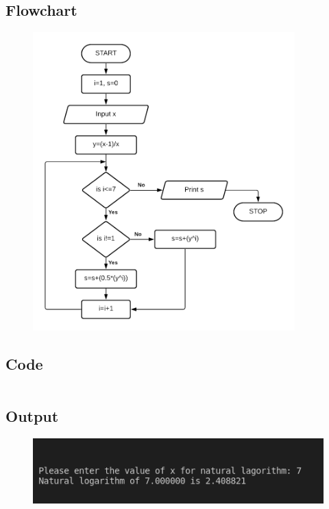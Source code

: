 \documentclass[12pt]{article}
\begin{document}
\section{}
\subsection{Flowchart}
\begin{figure}[h]
    \centering
    \includegraphics[width=0.9\textwidth]{Flowchart10.png}
\end{figure}
\newpage
\subsection{Code}
\inputminted{c}{q10.c}
\subsection{Output}
\begin{figure}[h]
    \centering
    \includegraphics[width=1.0\textwidth]{10.png}
\end{figure}
\newpage
\end{document}
